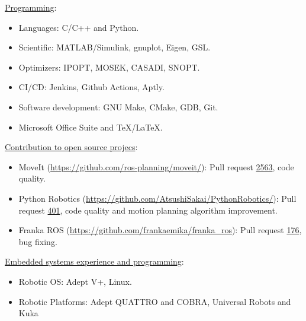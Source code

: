 \addskill%
{%
    \underline{Programming}:%
    \begin{itemize}[nosep, rightmargin=0cm]%
        \item Languages: C/C++ and Python.%
        \item Scientific: MATLAB/Simulink, gnuplot, Eigen, GSL.%
        \item Optimizers: IPOPT, MOSEK, CASADI, SNOPT.%
        \item CI/CD: Jenkins, Github Actions, Aptly.%
        \item Software development: GNU Make, CMake, GDB, Git.%
        \item Microsoft Office Suite and TeX/LaTeX.%
    \end{itemize}%
}%
\addskill%
{%
    \underline{Contribution to open source projecs}:%
    \begin{itemize}[nosep, rightmargin=0cm]%
        \item MoveIt (\url{https://github.com/ros-planning/moveit/}): Pull request \href{https://github.com/ros-planning/moveit/pull/2563}{2563}, code quality.%
        \item Python Robotics (\url{https://github.com/AtsushiSakai/PythonRobotics/}): Pull request  \href{https://github.com/AtsushiSakai/PythonRobotics/pull/401}{401}, code quality and motion planning algorithm improvement.%
        \item Franka ROS (\url{https://github.com/frankaemika/franka_ros}): Pull request \href{https://github.com/frankaemika/franka_ros/pull/176}{176}, bug fixing.%
    \end{itemize}%
}%
\addskill%
{%
    \underline{Embedded systems experience and programming}:%
    \begin{itemize}[nosep, rightmargin=0cm]%
        \item Robotic OS: Adept V+, Linux.%
        \item Robotic Platforms: Adept QUATTRO and COBRA, Universal Robots and Kuka%
    \end{itemize}%
}%

